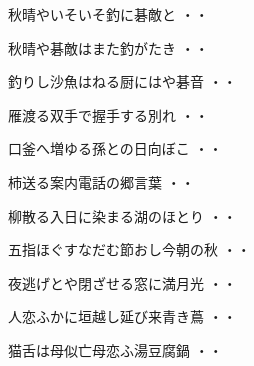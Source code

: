 \begin{shiika}秋晴やいそいそ釣に碁敵と
\hfill{・・}\end{shiika}
\vspace{0.6cm}
\begin{shiika}秋晴や碁敵はまた釣がたき
\hfill{・・}\end{shiika}
\vspace{0.6cm}
\begin{shiika}釣りし沙魚はねる厨にはや碁音
\hfill{・・}\end{shiika}
\vspace{0.6cm}
\begin{shiika}雁渡る双手で握手する別れ
\hfill{・・}\end{shiika}
\vspace{0.6cm}
\begin{shiika}口釜へ増ゆる孫との日向ぼこ
\hfill{・・}\end{shiika}
\vspace{0.6cm}
\begin{shiika}柿送る案内電話の郷言葉
\hfill{・・}\end{shiika}
\vspace{0.6cm}
\begin{shiika}柳散る入日に染まる湖のほとり
\hfill{・・}\end{shiika}
\vspace{0.6cm}
\begin{shiika}五指ほぐすなだむ節おし今朝の秋
\hfill{・・}\end{shiika}
\vspace{0.6cm}
\begin{shiika}夜逃げとや閉ざせる窓に満月光
\hfill{・・}\end{shiika}
\vspace{0.6cm}
\begin{shiika}人恋ふかに垣越し延び来青き蔦
\hfill{・・}\end{shiika}
\vspace{0.6cm}
\begin{shiika}猫舌は母似亡母恋ふ湯豆腐鍋
\hfill{・・}\end{shiika}
\vspace{0.6cm}
